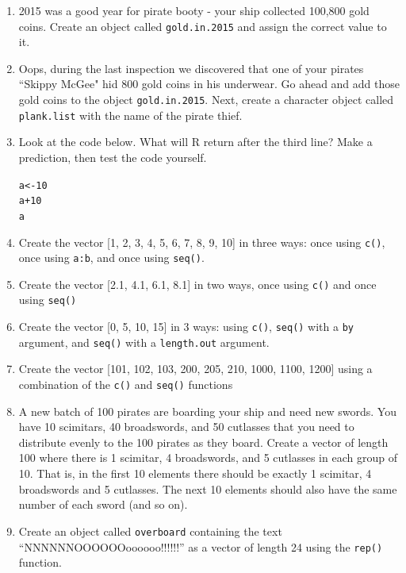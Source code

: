 \documentclass{tufte-book}\usepackage[]{graphicx}\usepackage[]{color}
\makeatletter
\newcommand{\hlnum}[1]{\textcolor[rgb]{0.686,0.059,0.569}{#1}}%
\newcommand{\hlopt}[1]{\textcolor[rgb]{0,0,0}{#1}}%
\newcommand{\hlstd}[1]{\textcolor[rgb]{0.345,0.345,0.345}{#1}}%
\newcommand{\hlkwb}[1]{\textcolor[rgb]{0.69,0.353,0.396}{#1}}%
\newenvironment{kframe}{%
 \def\at@end@of@kframe{}%
 \ifinner\ifhmode%
  \def\at@end@of@kframe{\end{minipage}}%
  \begin{minipage}{\columnwidth}%
 \fi\fi%
 \def\FrameCommand##1{\hskip\@totalleftmargin \hskip-\fboxsep
 \colorbox{shadecolor}{##1}\hskip-\fboxsep
     \hskip-\linewidth \hskip-\@totalleftmargin \hskip\columnwidth}%
 \MakeFramed {\advance\hsize-\width
   \@totalleftmargin\z@ \linewidth\hsize
   \@setminipage}}%
 {\par\unskip\endMakeFramed%
 \at@end@of@kframe}
\newenvironment{knitrout}{}{} %
\makeatother
\begin{document}
\begin{enumerate}

\item 2015 was a good year for pirate booty - your ship collected 100,800 gold coins. Create an object called \texttt{gold.in.2015} and assign the correct value to it.

\item Oops, during the last inspection we discovered that one of your pirates ``Skippy McGee" hid 800 gold coins in his underwear. Go ahead and add those gold coins to the object \texttt{gold.in.2015}. Next, create a character object called \texttt{plank.list} with the name of the pirate thief.

\item Look at the code below. What will R return after the third line? Make a prediction, then test the code yourself.

\begin{knitrout}
\color{fgcolor}\begin{kframe}
\begin{alltt}
\hlstd{a} \hlkwb{<-} \hlnum{10}
\hlstd{a} \hlopt{+} \hlnum{10}
\hlstd{a}
\end{alltt}
\end{kframe}
\end{knitrout}

\item Create the vector [1, 2, 3, 4, 5, 6, 7, 8, 9, 10] in three ways: once using \texttt{c()}, once using \texttt{a:b}, and once using \texttt{seq()}.

\item Create the vector [2.1, 4.1, 6.1, 8.1] in two ways, once using \texttt{c()} and once using \texttt{seq()}

\item Create the vector [0, 5, 10, 15] in 3 ways: using \texttt{c()}, \texttt{seq()} with a \texttt{by} argument, and \texttt{seq()} with a \texttt{length.out} argument.

\item Create the vector [101, 102, 103, 200, 205, 210, 1000, 1100, 1200] using a combination of the \texttt{c()} and \texttt{seq()} functions

\item A new batch of 100 pirates are boarding your ship and need new swords. You have 10 scimitars, 40 broadswords, and 50 cutlasses that you need to distribute evenly to the 100 pirates as they board. Create a vector of length 100 where there is 1 scimitar, 4 broadswords, and 5 cutlasses in each group of 10. That is, in the first 10 elements there should be exactly 1 scimitar, 4 broadswords and 5 cutlasses. The next 10 elements should also have the same number of each sword (and so on).

\item Create an object called \texttt{overboard} containing the text ``NNNNNNOOOOOOoooooo!!!!!!'' as a vector of length 24 using the \texttt{rep()} function.


\end{enumerate}
\end{document}
